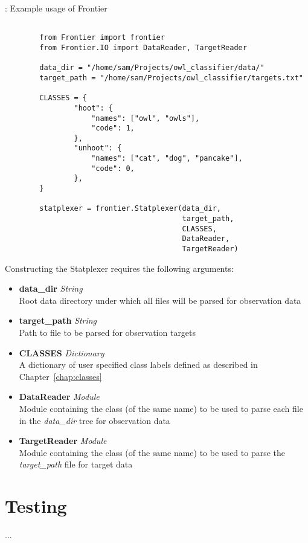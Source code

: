 \begin{listing}[H]
    \caption[callstatplexer]{: Example usage of Frontier}
    \label{list:callstatplexer}
    \begin{verbatim}

        from Frontier import frontier
        from Frontier.IO import DataReader, TargetReader

        data_dir = "/home/sam/Projects/owl_classifier/data/"
        target_path = "/home/sam/Projects/owl_classifier/targets.txt"

        CLASSES = {
                "hoot": {
                    "names": ["owl", "owls"],
                    "code": 1,
                },
                "unhoot": {
                    "names": ["cat", "dog", "pancake"],
                    "code": 0,
                },
        }

        statplexer = frontier.Statplexer(data_dir,
                                         target_path,
                                         CLASSES,
                                         DataReader,
                                         TargetReader)
    \end{verbatim}
\end{listing}

Constructing the Statplexer requires the following arguments:

\begin{itemize}
    \item \textbf{data\_dir} \textit{String}\hfill\\
        Root data directory under which all files will be parsed for observation data
    \item \textbf{target\_path} \textit{String}\hfill\\
        Path to file to be parsed for observation targets
    \item \textbf{CLASSES} \textit{Dictionary}\hfill\\
        A dictionary of user specified class labels defined as described in
        Chapter~\ref{chap:classes}
    \item \textbf{DataReader} \textit{Module}\hfill\\
        Module containing the class (of the same name) to be used to parse each
        file in the \textit{data\_dir} tree for observation data
    \item \textbf{TargetReader} \textit{Module}\hfill\\
        Module containing the class (of the same name) to be used to parse the
        \textit{target\_path} file for target data
\end{itemize}


\section{Testing}

...


